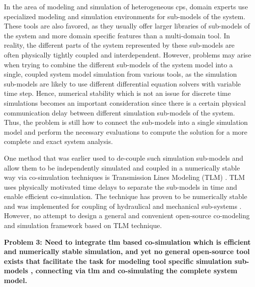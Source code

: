 In the area of modeling and simulation of heterogeneous \acrshort{cps}, domain experts use specialized modeling and simulation environments for sub-models of the system. These tools are also favored, as they usually offer larger libraries of sub-models of the system and more domain specific features than a multi-domain tool. In reality, the different parts of the system represented by these sub-models are often physically tightly coupled and interdependent. However, problems may arise when trying to combine the different sub-models of the system model into a single, coupled system model simulation from various tools, as the simulation sub-models are likely to use different differential equation solvers with variable time step. Hence, numerical stability which is not an issue for discrete time simulations becomes an important consideration since there is a certain physical communication delay between different simulation sub-models of the system. Thus, the problem is still how to connect the sub-models into a single simulation model and perform the necessary evaluations to compute the solution for a more complete and exact system analysis. 

One method that was earlier used to de-couple such simulation sub-models and allow them to be independently simulated and coupled in a numerically stable way via co-simulation techniques is Transmission Lines Modeling (TLM) \cite{tlmkurs90,tlmkurs99,tlmcogan,tlmjohns}. TLM uses physically motivated time delays to separate the sub-models in time and enable efficient co-simulation. The technique has proven to be numerically stable and was implemented for coupling of hydraulical and mechanical sub-systems \cite{tlmkurs90,tlmkurs99}. However, no attempt to design a general and convenient open-source co-modeling and simulation framework based on TLM technique. 

\begin{description}

\item \textbf{Problem 3: Need to integrate \acrshort{tlm} based co-simulation which is  efficient and numerically stable simulation, and yet no general open-source  tool exists that facilitate the task  for modeling tool specific simulation sub-models , connecting via \acrshort{tlm}  and co-simulating the complete system model.}

\end{description}

